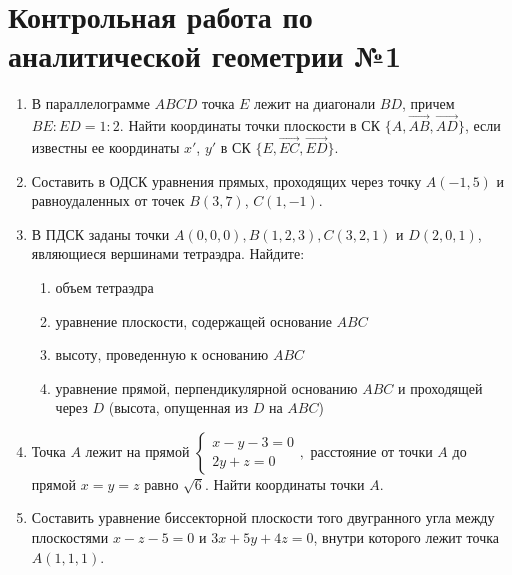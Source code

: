 \documentclass{angem}
\begin{document}
\sloppy
	\fancyhead[R]{}
	\section*{Контрольная работа по аналитической геометрии №1}
	\begin{enumerate}
		\item В параллелограмме $ABCD$ точка $E$ лежит на диагонали $BD$, причем ${BE : ED = 1 : 2}$. Найти координаты точки плоскости в СК $\{A, \overrightarrow{AB}, \overrightarrow{AD}\}$, если известны ее координаты $x'$, $y'$ в СК $\{E, \overrightarrow{EC}, \overrightarrow{ED}\}$.
		
		\item Составить в ОДСК уравнения прямых, проходящих через точку $A(-1, 5)$ и равноудаленных от точек $B(3, 7)$, $C(1, -1)$.
		
		\item В ПДСК заданы точки $A(0, 0, 0), B(1, 2, 3), C(3, 2, 1)$ и $D(2, 0, 1)$, являющиеся вершинами тетраэдра. Найдите:
         \begin{enumerate}
         	\item объем тетраэдра
	        \item уравнение плоскости, содержащей основание $ABC$
	        \item высоту, проведенную к основанию $ABC$
	        \item уравнение прямой, перпендикулярной основанию $ABC$ и проходящей через $D$ (высота, опущенная из $D$ на $ABC$)
	    \end{enumerate}
	    
	    \item Точка $A$ лежит на прямой $\begin{cases}
	    	x-y-3=0\\2y+z=0\end{cases},$ расстояние от точки $A$ до прямой ${x=y=z}$ равно $\sqrt{6}$. Найти координаты точки $A$.
	    
	    \item 
	    Составить уравнение биссекторной плоскости того двугранного угла между плоскостями $x-z-5=0$ и $3x+5y+4z=0$, внутри которого лежит точка $A(1, 1, 1)$.
	\end{enumerate}
\end{document}
